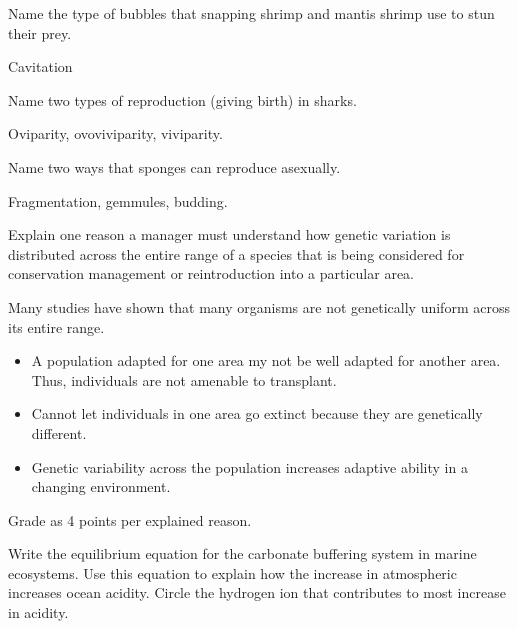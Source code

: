 \documentclass[11pt, addpoints]{exam}
\newcommand*\AnswerBox[2]{%
    \parbox[t][#1]{0.92\textwidth}{%
    \begin{solution}#2\end{solution}}
    \vspace*{\stretch{1}}
}
\newenvironment{AnswerPage}[1]
    {\begin{minipage}[t][#1]{0.92\textwidth}%
    \begin{solution}}
    {\end{solution}\end{minipage}
    \vspace*{\stretch{1}}}
\begin{document}
{\fontsize{20pt}{24pt}\selectfont

\begin{questions}


\question[2]
Name the type of bubbles that snapping shrimp and mantis shrimp use to stun their prey.

\AnswerBox{0.1\textheight}{Cavitation}

\question[4]
Name two types of reproduction (giving birth) in sharks.

\AnswerBox{0.1\textheight}{Oviparity, ovoviviparity, viviparity.}

\question[4]
Name two ways that sponges can reproduce asexually.

\AnswerBox{0.1\textheight}{Fragmentation, gemmules, budding.}

\question[5]
Explain one reason a manager must understand how genetic variation is
distributed across the entire range of a species that is being
considered for conservation management or reintroduction into a
particular area.

\begin{AnswerPage}{0.4\textheight}
	Many studies have shown that many organisms are not genetically uniform across its entire range.  
	
	\begin{itemize}
		
		\item A population adapted for one area my not be well adapted for another area. Thus, individuals are not amenable to transplant.
		
		\item Cannot let individuals in one area go extinct because they are genetically different. 
		
		\item Genetic variability across the population increases adaptive ability in a changing environment.
	\end{itemize}
	
	Grade as 4 points per explained reason.
	
\end{AnswerPage}

\newpage


\question[10] \label{q:carbonate_buffering_system}
Write the equilibrium equation for the carbonate buffering system in
marine ecosystems. Use this equation to explain how the increase in
atmospheric  increases ocean acidity. Circle the hydrogen ion 
that contributes to most increase in acidity.


\end{questions}}
\end{document}
